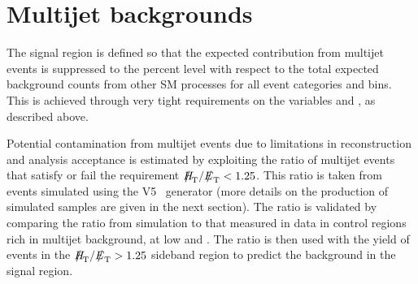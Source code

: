 \section{Multijet backgrounds}
\label{sec:qcd_background}

The signal region is defined so that the expected contribution from
multijet events is suppressed to the percent level with respect to
the total expected background counts from other SM processes for all
event categories and \scalht bins. This is achieved through very tight
requirements on the variables \alphat and \dphi, as described
above. 

Potential contamination from multijet events due to 
limitations in reconstruction and analysis acceptance is estimated 
by exploiting the ratio of multijet events that satisfy or fail the 
requirement $\mhtmet < 1.25$. This ratio is taken from events simulated 
using the \MADGRAPH V5~\cite{madgraph} generator 
(more details on the production of simulated samples are given in the next section).
The ratio is validated by comparing the ratio from simulation to that measured in data in control regions 
rich in multijet background, at low \alphat and \dphi.
The ratio is then used with the yield of events in the $\mhtmet > 1.25$ sideband region 
to predict the background in the signal region.

